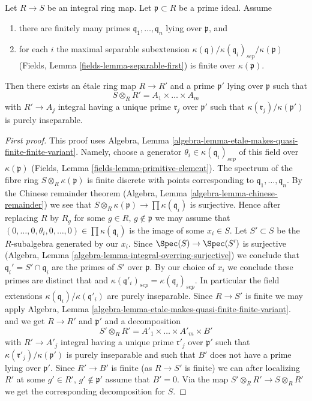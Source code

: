 \begin{lemma}
\label{lemma-etale-makes-integral-split}
Let $R \to S$ be an integral ring map. Let $\mathfrak p \subset R$ be a prime
ideal. Assume
\begin{enumerate}
\item there are finitely many primes $\mathfrak q_1, \ldots, \mathfrak q_n$
lying over $\mathfrak p$, and
\item for each $i$ the maximal separable subextension
$\kappa(\mathfrak q)/\kappa(\mathfrak q_i)_{sep}/\kappa(\mathfrak p)$
(Fields, Lemma \ref{fields-lemma-separable-first})
is finite over $\kappa(\mathfrak p)$.
\end{enumerate}
Then there exists an \'etale ring map $R \to R'$ and a prime
$\mathfrak p'$ lying over $\mathfrak p$ such that
$$
S \otimes_R R' = A_1 \times \ldots \times A_m
$$
with $R' \to A_j$ integral having a unique prime $\mathfrak r_j$
over $\mathfrak p'$ such that $\kappa(\mathfrak r_j)/\kappa(\mathfrak p')$
is purely inseparable.
\end{lemma}

\begin{proof}[First proof]
This proof uses
Algebra, Lemma \ref{algebra-lemma-etale-makes-quasi-finite-finite-variant}.
Namely, choose a generator $\theta_i \in \kappa(\mathfrak q_i)_{sep}$
of this field over $\kappa(\mathfrak p)$
(Fields, Lemma \ref{fields-lemma-primitive-element}).
The spectrum of the fibre ring $S \otimes_R \kappa(\mathfrak p)$
is finite discrete with points corresponding to
$\mathfrak q_1, \ldots, \mathfrak q_n$.
By the Chinese remainder theorem
(Algebra, Lemma \ref{algebra-lemma-chinese-remainder})
we see that $S \otimes_R \kappa(\mathfrak p) \to \prod \kappa(\mathfrak q_i)$
is surjective. Hence after replacing $R$ by $R_g$ for some
$g \in R$, $g \not \in \mathfrak p$ we may assume that
$(0, \ldots, 0, \theta_i, 0, \ldots, 0) \in \prod \kappa(\mathfrak q_i)$
is the image of some $x_i \in S$.
Let $S' \subset S$ be the $R$-subalgebra generated by our $x_i$.
Since $\Spec(S) \to \Spec(S')$ is surjective
(Algebra, Lemma \ref{algebra-lemma-integral-overring-surjective})
we conclude that
$\mathfrak q_i' = S' \cap \mathfrak q_i$ are the primes of
$S'$ over $\mathfrak p$. By our choice of $x_i$ we conclude
these primes are distinct that and
$\kappa(\mathfrak q'_i)_{sep} = \kappa(\mathfrak q_i)_{sep}$.
In particular the field extensions
$\kappa(\mathfrak q_i)/\kappa(\mathfrak q'_i)$ are purely
inseparable.
Since $R \to S'$ is finite we may apply
Algebra, Lemma \ref{algebra-lemma-etale-makes-quasi-finite-finite-variant}.
and we get $R \to R'$ and $\mathfrak p'$ and a decomposition
$$
S' \otimes_R R' = A'_1 \times \ldots \times A'_m \times B'
$$
with $R' \to A'_j$ integral having a unique prime
$\mathfrak r'_j$ over $\mathfrak p'$ such that
$\kappa(\mathfrak r'_j)/\kappa(\mathfrak p')$
is purely inseparable and such that $B'$ does not have a prime
lying over $\mathfrak p'$. Since $R' \to B'$ is finite
(as $R \to S'$ is finite) we can
after localizing $R'$ at some $g' \in R'$, $g' \not \in \mathfrak p'$
assume that $B' = 0$. Via the map $S' \otimes_R R' \to S \otimes_R R'$
we get the corresponding decomposition for $S$.
\end{proof}

